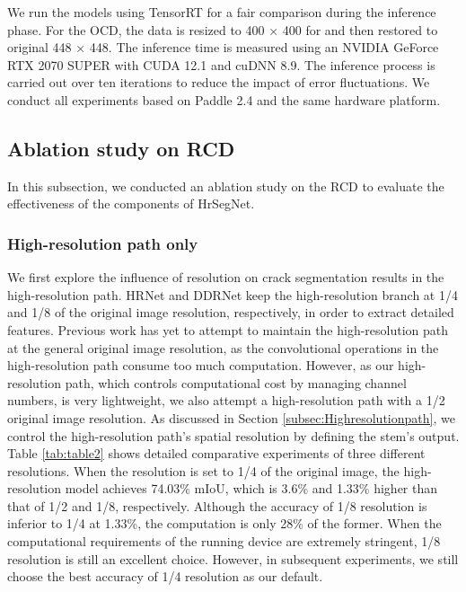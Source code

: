 \documentclass[preprint,12pt,authoryear]{elsarticle}
\begin{document}
We run the models using TensorRT for a fair comparison during the inference phase. For the OCD, the data is resized to 400 × 400 for and then restored to original 448 × 448. The inference time is measured using an NVIDIA GeForce RTX 2070 SUPER with CUDA 12.1 and cuDNN 8.9. The inference process is carried out over ten iterations to reduce the impact of error fluctuations. We conduct all experiments based on Paddle 2.4 and the same hardware platform.


\subsection{Ablation study on RCD}
\label{subsec:ablation}

In this subsection, we conducted an ablation study on the RCD to evaluate the effectiveness of the components of HrSegNet. 



\subsubsection{High-resolution path only}

We first explore the influence of resolution on crack segmentation results in the high-resolution path. HRNet \citep{wang_deep_2020} and DDRNet \citep{pan_deep_2023} keep the high-resolution branch at 1/4 and 1/8 of the original image resolution, respectively, in order to extract detailed features. Previous work has yet to attempt to maintain the high-resolution path at the general original image resolution, as the convolutional operations in the high-resolution path consume too much computation. However, as our high-resolution path, which controls computational cost by managing channel numbers, is very lightweight, we also attempt a high-resolution path with a 1/2 original image resolution. As discussed in Section \ref{subsec:Highresolutionpath}, we control the high-resolution path's spatial resolution by defining the stem's output. Table \ref{tab:table2} shows detailed comparative experiments of three different resolutions. When the resolution is set to 1/4 of the original image, the high-resolution model achieves 74.03\% mIoU, which is 3.6\% and 1.33\% higher than that of 1/2 and 1/8, respectively. Although the accuracy of 1/8 resolution is inferior to 1/4 at 1.33\%, the computation is only 28\% of the former. When the computational requirements of the running device are extremely stringent, 1/8 resolution is still an excellent choice. However, in subsequent experiments, we still choose the best accuracy of 1/4 resolution as our default.
\end{document}
